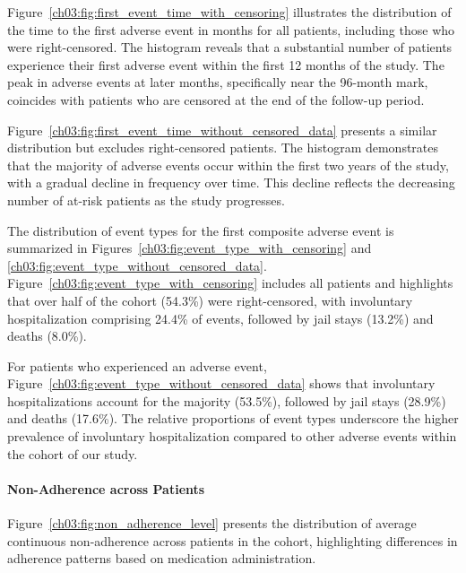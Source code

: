 Figure~\ref{ch03:fig:first_event_time_with_censoring} illustrates the distribution of the time to the first adverse event in months for all patients, including those who were right-censored. 
The histogram reveals that a substantial number of patients experience their first adverse event within the first 12 months of the study. 
The peak in adverse events at later months, specifically near the 96-month mark, coincides with patients who are censored at the end of the follow-up period. 

Figure~\ref{ch03:fig:first_event_time_without_censored_data} presents a similar distribution but excludes right-censored patients. 
The histogram demonstrates that the majority of adverse events occur within the first two years of the study, with a gradual decline in frequency over time. 
This decline reflects the decreasing number of at-risk patients as the study progresses. 

The distribution of event types for the first composite adverse event is summarized in Figures~\ref{ch03:fig:event_type_with_censoring} and \ref{ch03:fig:event_type_without_censored_data}. 
Figure~\ref{ch03:fig:event_type_with_censoring} includes all patients and highlights that over half of the cohort (54.3\%) were right-censored, with involuntary hospitalization comprising 24.4\% of events, followed by jail stays (13.2\%) and deaths (8.0\%). 

For patients who experienced an adverse event, Figure~\ref{ch03:fig:event_type_without_censored_data} shows that involuntary hospitalizations account for the majority (53.5\%), followed by jail stays (28.9\%) and deaths (17.6\%). 
The relative proportions of event types underscore the higher prevalence of involuntary hospitalization compared to other adverse events within the cohort of our study. 





\paragraph{Non-Adherence across Patients}
\label{ch03:apd:cohort_nonadherence}

Figure~\ref{ch03:fig:non_adherence_level} presents the distribution of average continuous non-adherence across patients in the cohort, highlighting differences in adherence patterns based on medication administration.


